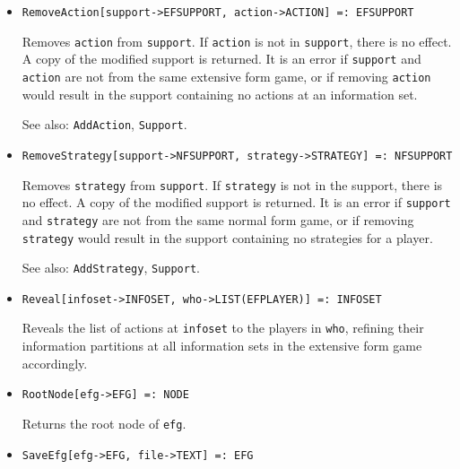 \begin{itemize}
\item{}
\protect \large \begin{verbatim}
RemoveAction[support->EFSUPPORT, action->ACTION] =: EFSUPPORT 
\end{verbatim}\normalsize
{}
\bd
Removes \verb+action+ from \verb+support+.  If \verb+action+ is
not in \verb+support+, there is no effect.  A copy of the modified
support is returned.  It is an error if \verb+support+ and \verb+action+
are not from the same extensive form game, or if removing \verb+action+
would result in the support containing no actions at an information set.
\item [See also:] \verb+AddAction+, \verb+Support+.
\ed

\item{}
\protect \large \begin{verbatim}
RemoveStrategy[support->NFSUPPORT, strategy->STRATEGY] =: NFSUPPORT 
\end{verbatim}\normalsize

\bd
Removes \verb+strategy+ from \verb+support+.  If \verb+strategy+ is not in
the support, there is no effect.  A copy of the modified support is
returned.  It is an error if \verb+support+ and \verb+strategy+ are
not from the same normal form game, or if removing \verb+strategy+
would result in the support containing no strategies for a player.
\item [See also:] \verb+AddStrategy+, \verb+Support+.
\ed

\item{}
\protect \large \begin{verbatim}
Reveal[infoset->INFOSET, who->LIST(EFPLAYER)] =: INFOSET 
\end{verbatim}\normalsize

\bd
Reveals the list of actions at \verb+infoset+ to the players in \verb+who+,
refining their information partitions at
all information sets in the extensive form game accordingly.  
\ed

\item{}
\protect \large \begin{verbatim}
RootNode[efg->EFG] =: NODE 
\end{verbatim}\normalsize

\bd
Returns the root node of \verb+efg+.
\ed


\item{}
\protect \large \begin{verbatim}
SaveEfg[efg->EFG, file->TEXT] =: EFG 
\end{verbatim}\normalsize


\end{itemize}

